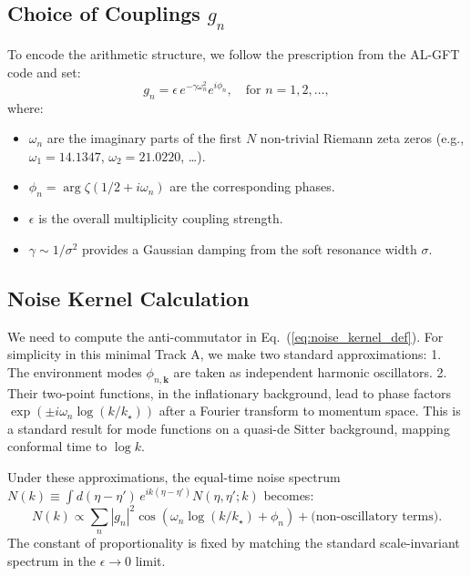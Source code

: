 \documentclass[12pt]{article}
\begin{document}
\subsection{Choice of Couplings $g_n$}
To encode the arithmetic structure, we follow the prescription from the AL-GFT code and set:
\begin{equation}
g_n = \epsilon \, e^{-\gamma \omega_n^2} e^{i \phi_n}, \quad \text{for } n = 1, 2, \dots,
\end{equation}
where:
\begin{itemize}
    \item $\omega_n$ are the imaginary parts of the first $N$ non-trivial Riemann zeta zeros (e.g., $\omega_1 = 14.1347$, $\omega_2 = 21.0220$, \dots).
    \item $\phi_n = \arg \zeta(1/2 + i \omega_n)$ are the corresponding phases.
    \item $\epsilon$ is the overall multiplicity coupling strength.
    \item $\gamma \sim 1/\sigma^2$ provides a Gaussian damping from the soft resonance width $\sigma$.
\end{itemize}

\subsection{Noise Kernel Calculation}
We need to compute the anti-commutator in Eq.~(\ref{eq:noise_kernel_def}). For simplicity in this minimal Track A, we make two standard approximations:
1.  The environment modes $\phi_{n,\bm{k}}$ are taken as independent harmonic oscillators.
2.  Their two-point functions, in the inflationary background, lead to phase factors $\exp(\pm i \omega_n \log(k/k_\star))$ after a Fourier transform to momentum space. This is a standard result for mode functions on a quasi-de Sitter background, mapping conformal time to $\log k$.

Under these approximations, the equal-time noise spectrum $N(k) \equiv \int d(\eta-\eta')\, e^{ik(\eta-\eta')} N(\eta,\eta';k)$ becomes:
\begin{equation}
N(k) \propto \sum_{n} |g_n|^2 \cos\left(\omega_n \log(k/k_\star) + \phi_n\right) + \text{(non-oscillatory terms)}.
\label{eq:Nk_intermediate}
\end{equation}
The constant of proportionality is fixed by matching the standard scale-invariant spectrum in the $\epsilon \to 0$ limit.
\end{document}
